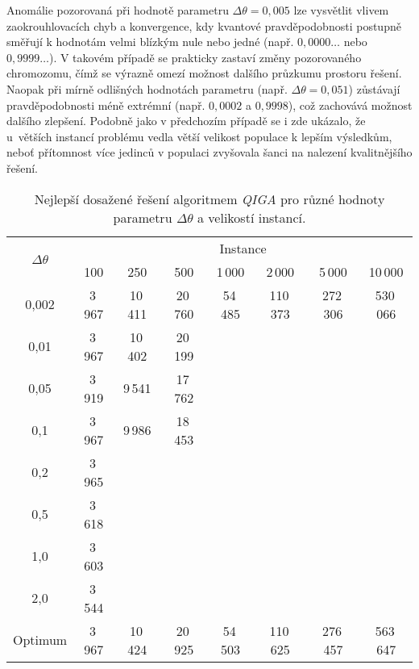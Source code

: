 Anomálie pozorovaná při hodnotě parametru $\Delta\theta = 0,005$ lze vysvětlit vlivem zaokrouhlovacích chyb a konvergence, kdy kvantové pravděpodobnosti postupně směřují k hodnotám velmi blízkým nule nebo jedné (např. $0,0000\dots$ nebo $0,9999\dots$). 
V takovém případě se prakticky zastaví změny pozorovaného chromozomu, čímž se výrazně omezí možnost dalšího průzkumu prostoru řešení.  
Naopak při mírně odlišných hodnotách parametru (např. $\Delta\theta = 0,051$) zůstávají pravděpodobnosti méně extrémní (např. $0,0002$ a $0,9998$), což zachovává možnost dalšího zlepšení. 
Podobně jako v předchozím případě se i zde ukázalo, že u~větších instancí problému vedla větší velikost populace k lepším výsledkům, neboť přítomnost více jedinců v populaci zvyšovala šanci na nalezení kvalitnějšího řešení.

\begin{table}[h!]
    \centering
    \begin{tabular}{c c c c c c c c}
        \toprule
        \multirow{2}{*}{\centering$\Delta\theta$\rule{0pt}{3.0ex}} & \multicolumn{7}{c}{Instance} \\
        \cmidrule(lr){2-8}
              & 100    & 250     & 500     & 1\,000  & 2\,000   & 5\,000   & 10\,000  \\
        \midrule
        0,002 & 3\,967 & 10\,411 & 20\,760 & 54\,485 & 110\,373 & 272\,306 & 530\,066 \\
        0,01  & 3\,967 & 10\,402 & 20\,199 &         &          &          &          \\
        0,05  & 3\,919 & 9\,541  & 17\,762 &         &          &          &          \\
        0,1   & 3\,967 & 9\,986  & 18\,453 &         &          &          &          \\
        0,2   & 3\,965 &         &         &         &          &          &          \\
        0,5   & 3\,618 &         &         &         &          &          &          \\
        1,0   & 3\,603 &         &         &         &          &          &          \\
        2,0   & 3\,544 &         &         &         &          &          &          \\
        \midrule
        Optimum & 3\,967 & 10\,424 & 20\,925 & 54\,503 & 110\,625 & 276\,457 & 563\,647 \\
        \bottomrule
    \end{tabular}
    \caption{Nejlepší dosažené řešení algoritmem \emph{QIGA} pro různé hodnoty parametru \(\Delta\theta\) a velikostí instancí.}
    \label{tab:qiga-theta-best}
\end{table}

